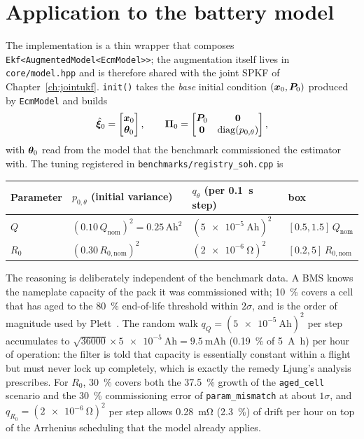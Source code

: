 \section{Application to the battery model}
\label{sec:je-app}
The implementation is a thin wrapper that composes \texttt{Ekf<AugmentedModel<EcmModel>{}>}; the
augmentation itself lives in \texttt{core/model.hpp} and is therefore shared with the joint SPKF of
Chapter~\ref{ch:jointukf}.  \texttt{init()} takes the \emph{base} initial condition
$(\bm{x}_0,\bm{P}_0)$ produced by \texttt{EcmModel} and builds
\begin{equation}
\hat{\bm{\xi}}_0=\begin{bmatrix}\bm{x}_0\\ \bm{\theta}_0\end{bmatrix},\qquad
\bm{\Pi}_0=\begin{bmatrix}\bm{P}_0&\bm{0}\\ \bm{0}&\operatorname{diag}(p_{0,\theta})\end{bmatrix},
\label{eq:je-init}
\end{equation}
with $\bm{\theta}_0$ read from the model that the benchmark commissioned the estimator with.  The
tuning registered in \texttt{benchmarks/registry\_soh.cpp} is
\begin{center}
\begin{tabular}{@{}llll@{}}
\toprule
Parameter & $p_{0,\theta}$ (initial variance) & $q_\theta$ (per \SI{0.1}{\second} step) & box \\
\midrule
$Q$   & $(0.10\,Q_\text{nom})^2=0.25\,\mathrm{Ah}^2$ & $(\SI{5e-5}{\ampere\hour})^2$ & $[0.5,1.5]\,Q_\text{nom}$\\
$R_0$ & $(0.30\,R_{0,\text{nom}})^2$                             & $(\SI{2e-6}{\ohm})^2$          & $[0.2,5]\,R_{0,\text{nom}}$\\
\bottomrule
\end{tabular}
\end{center}
The reasoning is deliberately independent of the benchmark data.  A BMS knows the nameplate
capacity of the pack it was commissioned with; \SI{10}{\percent} covers a cell that has aged to the
\SI{80}{\percent} end-of-life threshold within $2\sigma$, and is the order of magnitude used by
Plett~\cite{plett2004ekf3}.  The random walk $q_Q=(\SI{5e-5}{\ampere\hour})^2$ per step
accumulates to $\sqrt{36000}\times\SI{5e-5}{\ampere\hour}=\SI{9.5}{\milli\ampere\hour}$
(\SI{0.19}{\percent} of \SI{5}{\ampere\hour}) per hour of operation: the filter is told that
capacity is essentially constant within a flight but must never lock up completely, which is
exactly the remedy Ljung's analysis prescribes.  For $R_0$, \SI{30}{\percent} covers both the
\SI{37.5}{\percent} growth of the \texttt{aged\_cell} scenario and the \SI{30}{\percent}
commissioning error of \texttt{param\_mismatch} at about $1\sigma$, and
$q_{R_0}=(\SI{2e-6}{\ohm})^2$ per step allows \SI{0.28}{\milli\ohm} (\SI{2.3}{\percent}) of drift
per hour on top of the Arrhenius scheduling that the model already applies.

